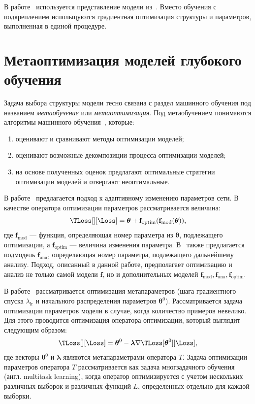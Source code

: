 В работе~\cite{darts} используется представление модели из~\cite{reinf_transfer}. Вместо обучения с подкреплением испольщуются градиентная оптимизация структуры и параметров, выполненная в единой процедуре.

\section{Метаоптимизация моделей глубокого обучения}
Задача выбора структуры модели тесно связана с раздел машинного обучения под названием \textit{метаобучение} или \textit{метаоптимизация}. Под метаобучением понимаются алгоритмы машинного обучения~\cite{metalearn}, которые:
\begin{enumerate}[1)]
\item оценивают и сравнивают методы оптимизации моделей;
\item оценивают возможные декомпозиции процесса оптимизации моделей;
\item на основе полученных оценок предлагают оптимальные стратегии оптимизации моделей и отвергают неоптимальные. 
\end{enumerate}

В работе~\cite{self_rnn} предлагается подход к адаптивному изменению параметров сети. В качестве оператора оптимизации параметров рассматривается величина:
\[
    \TLoss[][\Loss] = \boldsymbol{\theta} + \mathbf{f}_\text{optim}(\mathbf{f}_\text{mod}( \boldsymbol{\theta})),
\]
где $\mathbf{f}_\text{mod}$ --- функция, определяющая номер параметра из $\boldsymbol{\theta}$, подлежащего оптимизации, а $ \mathbf{f}_\text{optim}$ --- величина изменения параметра. 
В~\cite{self_rnn} также предлагается подмодель $\mathbf{f}_\text{ana}$, определяющая номер параметра, подлежащего дальнейшему анализу. Подход, описанный в данной работе, предполагает оптимизацию и анализ не только самой модели $\mathbf{f}$, но и дополнительных моделей $\mathbf{f}_\text{mod}, \mathbf{f}_\text{ana}, \mathbf{f}_\text{optim}$.

В работе~\cite{meta_sgd} рассматривается оптимизация метапараметров (шага градиентного спуска $\lambda_{\text{lr}}$ и начального распределения параметров $\boldsymbol{\theta}^0$). Рассматривается задача оптимизации параметров модели в случае, когда количество примеров невелико. Для этого проводится оптимизация оператора оптимизации, который выглядит следующим образом:
\[
    \TLoss[][\Loss] =  \boldsymbol{\theta}^0 - \boldsymbol{\lambda}\nabla  \TLoss[\teta^{0}][\Loss],
\]
где векторы $\boldsymbol{\theta}^0$ и $\boldsymbol{\lambda}$ являются метапараметрами оператора $T$. Задача оптимизации параметров оператора $T$ рассматривается как задача многзадачного обучения (англ. multitask learning), когда оператор оптимизируется с учетом нескольких различных выборок и различных функций $L$, определенных отдельно для каждой выборки.


